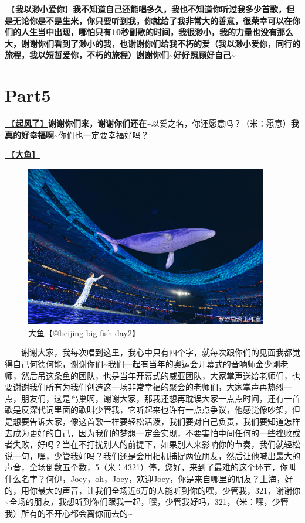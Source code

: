 \documentclass[]{ctexbook}
\begin{document}
\hyperref[loving-you-in-my-humble-way]{🎵【\textbf{我以渺小爱你}】}\textbf{我不知道自己还能唱多久，我也不知道你听过我多少首歌，但是无论你是不是生米，你只要听到我，你就给了我非常大的善意，很荣幸可以在你们的人生当中出现，哪怕只有10秒副歌的时间，我很渺小，我的力量也没有那么大，谢谢你们看到了渺小的我，也谢谢你们给我不朽的爱（我以渺小爱你，同行的旅程，我以短暂爱你，不朽的旅程）谢谢你们\textasciitilde 好好照顾好自己\textasciitilde{}}

\section{Part5}\label{beijing-20240922-part5}

\hyperref[the-wind-rises]{🎵【\textbf{起风了}】}\textbf{谢谢你们来，谢谢你们还在\textasciitilde{}}以爱之名，你还愿意吗？（米：愿意）\textbf{我真的好幸福啊\textasciitilde{}}你们也一定要幸福好吗？

\hyperref[big-fish]{🎵【\textbf{大鱼}】}

\begin{figure}

{\centering \includegraphics[width=300pt]{img/beijing20240922/big-fish} 

}

\caption{大鱼【@beijing-big-fish-day2】}\label{fig:unnamed-chunk-99}
\end{figure}

  谢谢大家，我每次唱到这里，我心中只有四个字，就每次跟你们的见面我都觉得自己何德何能，谢谢你们\textasciitilde 我们一起有当年的奥运会开幕式的音响师金少刚老师，然后吊这条鱼的团队，也是当年开幕式的威亚团队，大家掌声送给老师们，也要谢谢我们所有为我们创造这一场非常幸福的聚会的老师们，大家掌声再热烈一点，朋友们，这是鸟巢啊，谢谢大家，那我还想再耽误大家一点点时间，还有一首歌是反深代词里面的歌叫少管我，它听起来也许有一点点争议，他感觉像吵架，但是想要告诉大家，像这首歌一样要轻松活泼，我们要对自己负责，我们要知道怎样去成为更好的自己，因为我们的梦想一定会实现，不要害怕中间任何的一些挫败或者失败，好吗？当在不打扰别人的前提下，如果别人来影响你的节奏，我们就轻松说一句，嘿，少管我好吗？我们还是会用相机捕捉两位朋友，然后让他喊出最大的声音，全场倒数五个数，5（米：4321）停，您好，来到了最难的这个环节，你叫什么名字？何伊，Joey，oh，Joey，欢迎Joey，你是来自哪里的朋友？上海，好的，用你最大的声音，让我们全场近6万的人能听到你的嘿，少管我，321，谢谢你\textasciitilde 全场的朋友，我想听到你们跟我一起，嘿，少管我好吗，321，（米：嘿，少管我）所有的不开心都会离你而去的\textasciitilde{}
\end{document}
